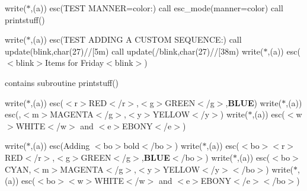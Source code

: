 write($\ast$,\textquotesingle{}(a)\textquotesingle{}) esc(\textquotesingle{}T\+E\+ST M\+A\+N\+N\+ER=color\+:\textquotesingle{}) call esc\+\_\+mode(manner=\textquotesingle{}color\textquotesingle{}) call printstuff()

write($\ast$,\textquotesingle{}(a)\textquotesingle{}) esc(\textquotesingle{}T\+E\+ST A\+D\+D\+I\+NG A C\+U\+S\+T\+OM S\+E\+Q\+U\+E\+N\+CE\+:\textquotesingle{}) call update(\textquotesingle{}blink\textquotesingle{},char(27)//\textquotesingle{}\mbox{[}5m\textquotesingle{}) call update(\textquotesingle{}/blink\textquotesingle{},char(27)//\textquotesingle{}\mbox{[}38m\textquotesingle{}) write($\ast$,\textquotesingle{}(a)\textquotesingle{}) esc(\textquotesingle{}$<$blink$>$Items for Friday$<$blink$>$\textquotesingle{})

contains subroutine printstuff()

write($\ast$,\textquotesingle{}(a)\textquotesingle{}) esc(\textquotesingle{}$<$r$>$R\+ED$<$/r$>$,$<$g$>$G\+R\+E\+EN$<$/g$>$,{\bfseries B\+L\+UE}\textquotesingle{}) write($\ast$,\textquotesingle{}(a)\textquotesingle{}) esc(,$<$m$>$M\+A\+G\+E\+N\+TA$<$/g$>$,$<$y$>$Y\+E\+L\+L\+OW$<$/y$>$\textquotesingle{}) write($\ast$,\textquotesingle{}(a)\textquotesingle{}) esc(\textquotesingle{}$<$w$>$W\+H\+I\+TE$<$/w$>$ and $<$e$>$E\+B\+O\+NY$<$/e$>$\textquotesingle{})

write($\ast$,\textquotesingle{}(a)\textquotesingle{}) esc(\textquotesingle{}Adding $<$bo$>$bold$<$/bo$>$\textquotesingle{}) write($\ast$,\textquotesingle{}(a)\textquotesingle{}) esc(\textquotesingle{}$<$bo$>$$<$r$>$R\+ED$<$/r$>$,$<$g$>$G\+R\+E\+EN$<$/g$>$,{\bfseries B\+L\+UE}$<$/bo$>$\textquotesingle{}) write($\ast$,\textquotesingle{}(a)\textquotesingle{}) esc(\textquotesingle{}$<$bo$>${\ttfamily C\+Y\+AN},$<$m$>$M\+A\+G\+E\+N\+TA$<$/g$>$,$<$y$>$Y\+E\+L\+L\+OW$<$/y$>$$<$/bo$>$\textquotesingle{}) write($\ast$,\textquotesingle{}(a)\textquotesingle{}) esc(\textquotesingle{}$<$bo$>$$<$w$>$W\+H\+I\+TE$<$/w$>$ and $<$e$>$E\+B\+O\+NY$<$/e$>$$<$/bo$>$\textquotesingle{})

